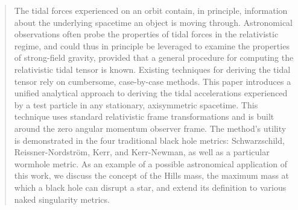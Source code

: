 \documentclass[
    reprint,
    prd,
    nofootinbib,
    amsmath,amssymb,
    aps,
    floatfix,
]{revtex4-2}
\begin{document}
\begin{abstract}
    The tidal forces experienced on an orbit contain, in principle, information about the underlying spacetime an object is moving through. Astronomical observations often probe the properties of tidal forces in the relativistic regime, and could thus in principle be leveraged to examine the properties of strong-field gravity, provided that a general procedure for computing the relativistic tidal tensor is known. Existing techniques for deriving the tidal tensor rely on cumbersome, case-by-case methods. This paper introduces a unified analytical approach to deriving the tidal accelerations experienced by a test particle in any stationary, axisymmetric spacetime. This technique uses standard relativistic frame transformations and is built around the zero angular momentum observer frame. The method's utility is demonstrated in the four traditional black hole metrics: Schwarzschild, Reissner-Nordström, Kerr, and Kerr-Newman, as well as a particular wormhole metric. As an example of a possible astronomical application of this work, we discuss the concept of the Hills mass, the maximum mass at which a black hole can disrupt a star, and extend its definition to various naked singularity metrics.
\end{abstract}


\maketitle






\end{document}
